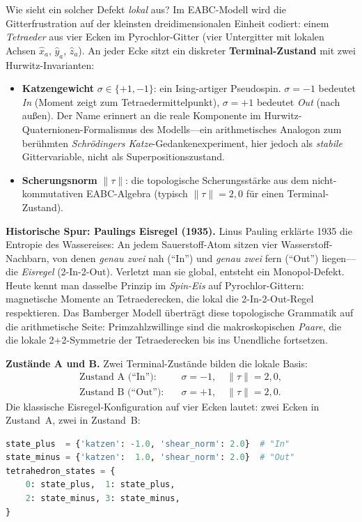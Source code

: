 \documentclass[11pt,a4paper]{article}
\begin{document}
Wie sieht ein solcher Defekt \emph{lokal} aus? Im EABC-Modell wird die Gitterfrustration auf der kleinsten dreidimensionalen Einheit codiert: einem \emph{Tetraeder} aus vier Ecken im Pyrochlor-Gitter (vier Untergitter mit lokalen Achsen $\hat{x}_a$, $\hat{y}_a$, $\hat{z}_a$). An jeder Ecke sitzt ein diskreter \textbf{Terminal-Zustand} mit zwei Hurwitz-Invarianten:
\begin{itemize}
  \item \textbf{Katzengewicht} $\sigma \in \{+1, -1\}$: ein Ising-artiger Pseudospin. $\sigma = -1$ bedeutet \emph{In} (Moment zeigt zum Tetraedermittelpunkt), $\sigma = +1$ bedeutet \emph{Out} (nach außen). Der Name erinnert an die reale Komponente im Hurwitz-Quaternionen-Formalismus des Modells---ein arithmetisches Analogon zum berühmten \emph{Schrödingers Katze}-Gedankenexperiment, hier jedoch als \emph{stabile} Gittervariable, nicht als Superpositionszustand.
  \item \textbf{Scherungsnorm} $\|\tau\|$: die topologische Scherungsstärke aus dem nicht-kommutativen EABC-Algebra (typisch $\|\tau\| = 2{,}0$ für einen Terminal-Zustand).
\end{itemize}

\medskip
\noindent\textbf{Historische Spur: Paulings Eisregel (1935).} Linus Pauling erklärte 1935 die Entropie des Wassereises: An jedem Sauerstoff-Atom sitzen vier Wasserstoff-Nachbarn, von denen \emph{genau zwei} nah (``In'') und \emph{genau zwei} fern (``Out'') liegen---die \emph{Eisregel} (2-In-2-Out). Verletzt man sie global, entsteht ein Monopol-Defekt. Heute kennt man dasselbe Prinzip im \emph{Spin-Eis} auf Pyrochlor-Gittern: magnetische Momente an Tetraederecken, die lokal die 2-In-2-Out-Regel respektieren. Das Bamberger Modell überträgt diese topologische Grammatik auf die arithmetische Seite: Primzahlzwillinge sind die makroskopischen \emph{Paare}, die die lokale 2+2-Symmetrie der Tetraederecken bis ins Unendliche fortsetzen.

\medskip
\noindent\textbf{Zustände A und B.} Zwei Terminal-Zustände bilden die lokale Basis:
\begin{align*}
  \text{Zustand A (``In''):}  &\quad \sigma = -1,\quad \|\tau\| = 2{,}0,\\
  \text{Zustand B (``Out''):} &\quad \sigma = +1,\quad \|\tau\| = 2{,}0.
\end{align*}
Die klassische Eisregel-Konfiguration auf vier Ecken lautet: zwei Ecken in Zustand~A, zwei in Zustand~B:
\begin{lstlisting}[language=Python,caption={Eisregel-Tetraeder im EABC-Hamiltonian (2-In-2-Out).}]
state_plus  = {'katzen': -1.0, 'shear_norm': 2.0}  # "In"
state_minus = {'katzen':  1.0, 'shear_norm': 2.0}  # "Out"
tetrahedron_states = {
    0: state_plus,  1: state_plus,
    2: state_minus, 3: state_minus,
}
\end{lstlisting}
\end{document}

